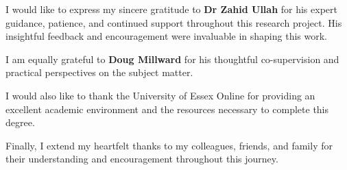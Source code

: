 I would like to express my sincere gratitude to \textbf{Dr Zahid Ullah} for his expert guidance, patience, and continued support throughout this research project. His insightful feedback and encouragement were invaluable in shaping this work.

I am equally grateful to \textbf{Doug Millward} for his thoughtful co-supervision and practical perspectives on the subject matter.

I would also like to thank the University of Essex Online for providing an excellent academic environment and the resources necessary to complete this degree.

Finally, I extend my heartfelt thanks to my colleagues, friends, and family for their understanding and encouragement throughout this journey.
